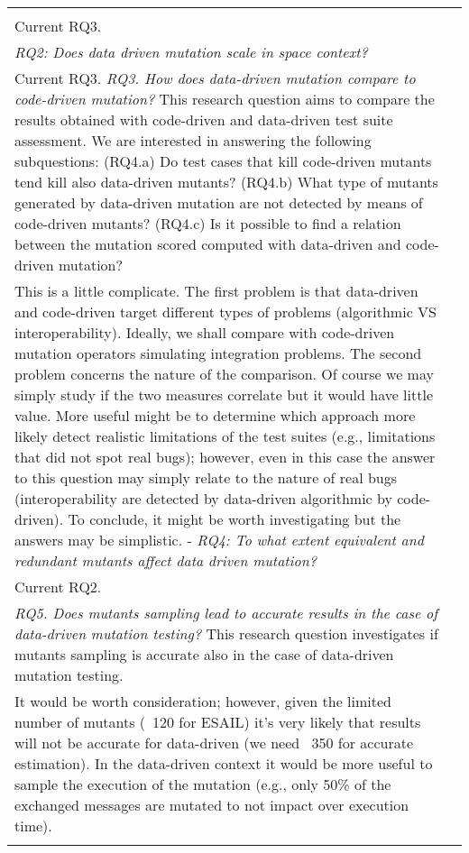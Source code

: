 \begin{longtable}{|p{2cm}|p{12cm}|@{}}
\begin{minipage}{12cm}
\emph{RQ1: Are data driven mutation cost affordable in space context?}\\
Current RQ3.\\
\emph{RQ2: Does data driven mutation scale in space context?}\\
Current RQ3.
\emph{RQ3. How does data-driven mutation compare to code-driven mutation?} This research question aims to compare the results obtained with code-driven and data-driven test suite assessment. We are interested in answering the following subquestions: (RQ4.a) Do test cases that kill code-driven mutants tend kill also data-driven mutants? (RQ4.b) What type of mutants generated by data-driven mutation are not detected by means of code-driven mutants? (RQ4.c) Is it possible to find a relation between the mutation scored computed with data-driven and code-driven mutation?\\
This is a little complicate. The first problem is that data-driven and code-driven target different types of problems (algorithmic VS interoperability). Ideally, we shall compare with code-driven mutation operators simulating integration problems. The second problem concerns the nature of the comparison. Of course we may simply study if the two measures correlate but it would have little value. More useful might be to determine which approach more likely detect realistic limitations of the test suites (e.g., limitations that did not spot real bugs); however, even in this case the answer to this question may simply relate to the nature of real bugs (interoperability are detected by data-driven algorithmic by code-driven). To conclude, it might be worth investigating but the answers may be simplistic.
-
\emph{RQ4: To what extent equivalent and redundant mutants affect data driven mutation?}\\
Current RQ2.\\

\emph{RQ5. Does mutants sampling lead to accurate results in the case of data-driven mutation testing?} This research question investigates if mutants sampling is accurate also in the case of data-driven mutation testing.\\
It would be worth consideration; however, given the limited number of mutants (~120 for ESAIL) it's very likely that results will not be accurate for data-driven (we need ~350 for accurate estimation). In the data-driven context it would be more useful to sample the execution of the mutation (e.g., only 50\% of the exchanged messages are mutated to not impact over execution time).\\


\end{minipage}
\end{longtable}
